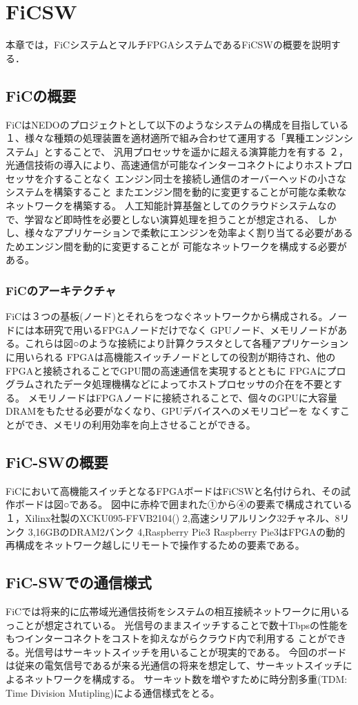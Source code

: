 \chapter{FiCSW}
{
\label{chap:ficsw}
本章では，FiCシステムとマルチFPGAシステムであるFiCSWの概要を説明する．

\section{FiCの概要}
\label{sec:about_fic}
FiCはNEDOのプロジェクトとして以下のようなシステムの構成を目指している
１、様々な種類の処理装置を適材適所で組み合わせて運用する「異種エンジンシステム」とすることで、
汎用プロセッサを遥かに超える演算能力を有する
２，光通信技術の導入により、高速通信が可能なインターコネクトによりホストプロセッサを介することなく
エンジン同士を接続し通信のオーバーヘッドの小さなシステムを構築すること
またエンジン間を動的に変更することが可能な柔軟なネットワークを構築する。
人工知能計算基盤としてのクラウドシステムなので、学習など即時性を必要としない演算処理を担うことが想定される、
しかし、様々なアプリケーションで柔軟にエンジンを効率よく割り当てる必要があるためエンジン間を動的に変更することが
可能なネットワークを構成する必要がある。
\subsection{FiCのアーキテクチャ}
\label{subsec:arch_fic}
FiCは３つの基板(ノード)とそれらをつなぐネットワークから構成される。ノードには本研究で用いるFPGAノードだけでなく
GPUノード、メモリノードがある。これらは図○のような接続により計算クラスタとして各種アプリケーションに用いられる
FPGAは高機能スイッチノードとしての役割が期待され、他のFPGAと接続されることでGPU間の高速通信を実現するとともに
FPGAにプログラムされたデータ処理機構などによってホストプロセッサの介在を不要とする。
メモリノードはFPGAノードに接続されることで、個々のGPUに大容量DRAMをもたせる必要がなくなり、GPUデバイスへのメモリコピーを
なくすことができ、メモリの利用効率を向上させることができる。
\section{FiC-SWの概要}
\label{sec:about_ficsw}
FiCにおいて高機能スイッチとなるFPGAボードはFiCSWと名付けられ、その試作ボードは図○である。
図中に赤枠で囲まれた①から④の要素で構成されている
１，Xilinx社製のXCKU095-FFVB2104()
2,高速シリアルリンク32チャネル、8リンク
3,16GBのDRAM2バンク
4,Raspberry Pie3
Raspberry Pie3はFPGAの動的再構成をネットワーク越しにリモートで操作するための要素である。
\section{FiC-SWでの通信様式}
\label{sec:ficsw_communication}
FiCでは将来的に広帯域光通信技術をシステムの相互接続ネットワークに用いるっことが想定されている。
光信号のままスイッチすることで数十Tbpsの性能をもつインターコネクトをコストを抑えながらクラウド内で利用する
ことができる。光信号はサーキットスイッチを用いることが現実的である。
今回のボードは従来の電気信号であるが来る光通信の将来を想定して、サーキットスイッチによるネットワークを構成する。
サーキット数を増やすために時分割多重(TDM: Time Division Mutipling)による通信様式をとる。


}
